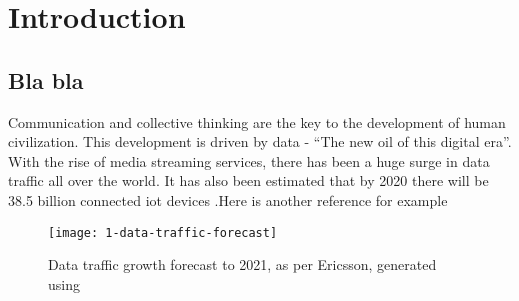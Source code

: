 \documentclass[../report.tex]{subfiles}
\begin{document}
	

	
\chapter{Introduction} 
	\section{Bla bla}
Communication and collective thinking are the key to the development of human civilization. This development is driven by data - “The new oil of this digital era”. With the rise of media streaming services, there has been a huge surge in data traffic all over the world. It has also been estimated that by 2020 there will be 38.5 billion connected \gls{iot} devices \cite{gartner_iot,juniper_iot}.Here is another reference for example \cite{green_efficient_2001}

\begin{figure}[h]
	\centering
	\texttt{[image: 1-data-traffic-forecast]}
	\caption{Data traffic growth forecast to 2021, as per Ericsson, generated using }
	\label{fig:1_data_traffic_forecast}
\end{figure}



\end{document}
